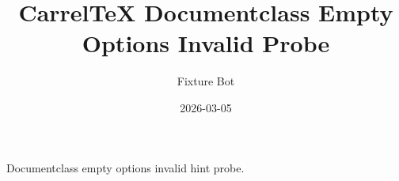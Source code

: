 \documentclass[twoside,,openright]{memoir}
\title{CarrelTeX Documentclass Empty Options Invalid Probe}
\author{Fixture Bot}
\date{2026-03-05}
\begin{document}
\maketitle

Documentclass empty options invalid hint probe.
\end{document}
